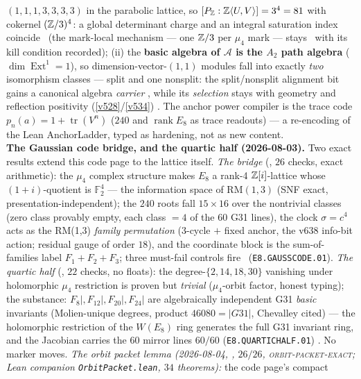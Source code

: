 \begin{winbox}
$(1,1,1,3,3,3,3)$ in the parabolic lattice, so $[P_{\mathbb{Z}}:\mathbb{Z}\langle U,V\rangle]=3^4=81$ with cokernel
$(\mathbb{Z}/3)^4$: a global determinant charge and an integral saturation index coincide \mE\ (the
mark-local mechanism --- one $\mathbb{Z}/3$ per $\mu_4$ mark --- stays \mO\ with its kill condition
recorded); (ii) the \textbf{basic algebra of $\mathcal A$ is the $A_2$ path algebra}
($\dim\operatorname{Ext}^1=1$), so dimension-vector-$(1,1)$ modules fall into exactly \emph{two}
isomorphism classes --- split and one nonsplit: the split/nonsplit alignment bit gains a canonical
algebra \emph{carrier} \mE, while its \emph{selection} stays with geometry and reflection positivity
(\vref{v528}/\vref{v534}) \mC.  The anchor power compiler is the trace code $p_n(a)=1+
\operatorname{tr}(V^n)$ ($240$ and $\operatorname{rank}E_8$ as trace readouts) --- a re-encoding of
the Lean AnchorLadder, typed as hardening, not as new content.
\smallskip\\
\noindent\textbf{The Gaussian code bridge, and the quartic half (2026-08-03).}
Two exact results extend this code page to the lattice itself.
\emph{The bridge} (, $26$ checks,
exact arithmetic): the $\mu_4$ complex structure makes $E_8$ a rank-4
$\mathbb{Z}[i]$-lattice whose $(1+i)$-quotient is $\mathbb F_2^4$ --- the
information space of $\mathrm{RM}(1,3)$ (SNF exact,
presentation-independent); the $240$ roots fall $15\times16$ over the
nontrivial classes (zero class provably empty, each class $=4$ of the
$60$ G31 lines), the clock $\sigma=c^4$ acts as the RM(1,3)
\emph{family permutation} (3-cycle $+$ fixed anchor, the v638
info-bit action; residual gauge of order $18$), and the coordinate
block is the sum-of-families label $F_1{+}F_2{+}F_3$; three
must-fail controls fire \mE\ (\texttt{E8.GAUSSCODE.01}).  \emph{The
quartic half} (, $22$ checks, no
floats): the degree-$\{2,14,18,30\}$ vanishing under holomorphic
$\mu_4$ restriction is proven but \emph{trivial} ($\mu_4$-orbit
factor, honest typing); the substance: $F_8|,F_{12}|,F_{20}|,F_{24}|$
are algebraically independent G31 \emph{basic} invariants (Molien-unique
degrees, product $46080=|G31|$, Chevalley cited) --- the holomorphic
restriction of the $W(E_8)$ ring generates the full G31 invariant
ring, and the Jacobian carries the $60$ mirror lines $60/60$
(\texttt{E8.QUARTICHALF.01}) \mE.  No marker moves.
\emph{The orbit packet lemma (2026-08-04,
, $26/26$,
\textsc{orbit-packet-exact}; Lean companion
\texttt{OrbitPacket.lean}, $34$ theorems):} the code page's compact

\end{winbox}
